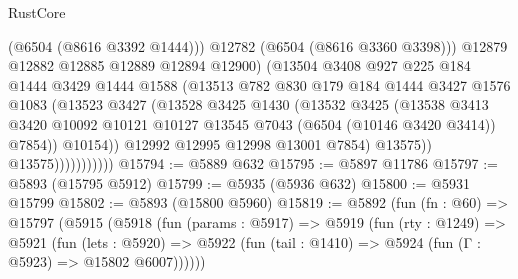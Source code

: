\begin{lexlean}{RustCore}
\begin{coremodule}
                                  (@6504 (@8616 @3392 @1444)))
                                @12782
                                (@6504 (@8616 @3360 @3398)))
                              @12879
                              @12882
                              @12885
                              @12889
                              @12894
                              @12900)
                            (@13504
                              @3408
                              @927
                              @225
                              @184
                              @1444
                              @3429
                              @1444
                              @1588
                              (@13513
                                @782
                                @830
                                @179
                                @184
                                @1444
                                @3427
                                @1576
                                @1083
                                (@13523
                                  @3427
                                  (@13528
                                    @3425
                                    @1430
                                    (@13532
                                      @3425
                                      (@13538
                                        @3413
                                        @3420
                                        @10092
                                        @10121
                                        @10127
                                        @13545
                                        @7043
                                        (@6504 (@10146 @3420 @3414))
                                        @7854))
                                    @10154))
                                @12992
                                @12995
                                @12998
                                @13001
                                @7854)
                              @13575))
                          @13575)))))))))))
@15794 := @5889 @632
@15795 := @5897 @11786
@15797 := @5893 (@15795 @5912)
@15799 := @5935 (@5936 @632)
@15800 := @5931 @15799
@15802 := @5893 (@15800 @5960)
@15819 := @5892
    (fun (fn : @60) =>
    @15797
      (@5915
        (@5918
          (fun (params : @5917) =>
          @5919
            (fun (rty : @1249) =>
            @5921
              (fun (lets : @5920) =>
              @5922 (fun (tail : @1410) => @5924 (fun (Γ : @5923) => @15802 @6007))))))

\end{coremodule}
\end{lexlean}
